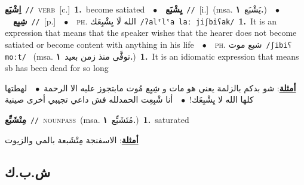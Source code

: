 \documentclass[10pt,a4paper,twoside]{article} %
\begin{document}
\begin{multicols}{2}
{{{{{{{{{{{\setlength\topsep{0pt}\textbf{\foreignlanguage{arabic}{اِشْبَع}}\ {\color{gray}\texttt{//}\color{black}}\ \textsc{verb}\ [c.]\ \textbf{1.}~become satiated\ \ $\bullet$\ \ \setlength\topsep{0pt}\textbf{\foreignlanguage{arabic}{يِشْبَع}}\ {\color{gray}\texttt{//}\color{black}}\ [i.]\ \color{gray}(msa. \foreignlanguage{arabic}{يَشْبَع}~\foreignlanguage{arabic}{\textbf{١.}})\color{black}\ \ $\bullet$\ \ \setlength\topsep{0pt}\textbf{\foreignlanguage{arabic}{شِبِع}}\ {\color{gray}\texttt{//}\color{black}}\ [p.]\ \ $\bullet$\ \ \textsc{ph.} \color{gray} \foreignlanguage{arabic}{الله لَا يِشْبِعَك}\color{black}\ {\color{gray}\texttt{/{\sffamily ʔalˤlˤa laː jiʃbiʕak}/}\color{black}}\ \textbf{1.}~It is an expression that means that the speaker wishes that the hearer does not become satiated or become content with anything in his life\ \ $\bullet$\ \ \textsc{ph.} \color{gray} \foreignlanguage{arabic}{شبع موت}\color{black}\ {\color{gray}\texttt{/{\sffamily ʃibiʕ moːt}/}\color{black}}\ \color{gray} (msa. \foreignlanguage{arabic}{توفَّى منذ زمن بعيد}~\foreignlanguage{arabic}{\textbf{١.}})\color{black}\ \textbf{1.}~It is an idiomatic expression that means sb has been dead for so long\  \begin{flushright}\color{gray}\foreignlanguage{arabic}{\textbf{\underline{\foreignlanguage{arabic}{أمثلة}}}: شو بدكم بالزلمة يعني هو مات و شِبِع مُوت مابتجوز عليه الا الرحمة\ $\bullet$\ \  لهطتها كلها الله لا يِشْبِعَك!\ $\bullet$\ \  أنا شْبِعِت الحمدلله فش داعي تجيبي أخرى صينية}\end{flushright}\color{black}} \vspace{2mm}

{\setlength\topsep{0pt}\textbf{\foreignlanguage{arabic}{مِتْشَبِّع}}\ {\color{gray}\texttt{//}\color{black}}\ \textsc{noun\textunderscore pass}\ \color{gray}(msa. \foreignlanguage{arabic}{مُتَشَبِّع}~\foreignlanguage{arabic}{\textbf{١.}})\color{black}\ \textbf{1.}~saturated\  \begin{flushright}\color{gray}\foreignlanguage{arabic}{\textbf{\underline{\foreignlanguage{arabic}{أمثلة}}}: الاسفنجة مِتْشَبعة بالمي والزيوت}\end{flushright}\color{black}} \vspace{2mm}

\vspace{-3mm}
\subsection*{\color{blue}\foreignlanguage{arabic}{ش.ب.ك}\color{blue}{}} 

}}}}}}}}}}
\end{multicols}
\end{document}
